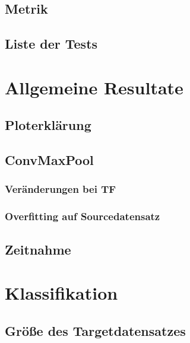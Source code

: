 \documentclass[ngerman]{report}
\begin{document}
    \section{Metrik}
    
    \section{Liste der Tests}
    

    \chapter{Allgemeine Resultate}  %
    \section{Ploterklärung}
    
    \section{ConvMaxPool}
    
    \subsection{Veränderungen bei TF}
    
    \subsection{Overfitting auf Sourcedatensatz}
    
    \section{Zeitnahme}
    

    \chapter{Klassifikation}  %
    \section{Größe des Targetdatensatzes}
    
\end{document}
